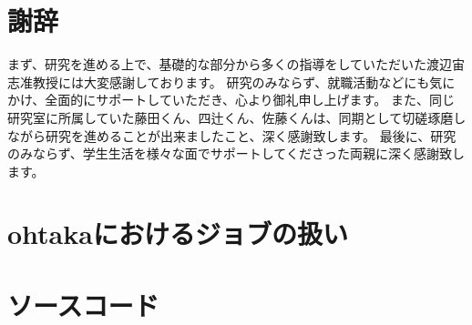 \documentclass[titlepage]{jsreport}
\begin{document}
\chapter*{謝辞}
まず、研究を進める上で、基礎的な部分から多くの指導をしていただいた渡辺宙志准教授には大変感謝しております。
研究のみならず、就職活動などにも気にかけ、全面的にサポートしていただき、心より御礼申し上げます。
また、同じ研究室に所属していた藤田くん、四辻くん、佐藤くんは、同期として切磋琢磨しながら研究を進めることが出来ましたこと、深く感謝致します。
最後に、研究のみならず、学生生活を様々な面でサポートしてくださった両親に深く感謝致します。

\appendix
\chapter{ohtakaにおけるジョブの扱い}


\chapter{ソースコード}






\end{document}
